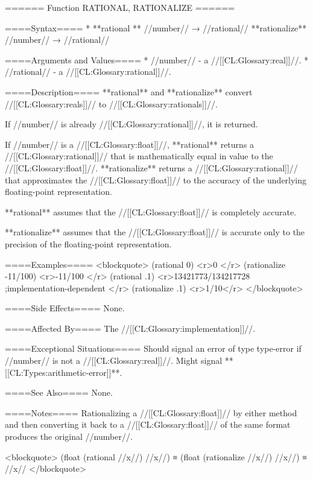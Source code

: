 ====== Function RATIONAL, RATIONALIZE ======

====Syntax====
  * **rational ** //number// → //rational// **rationalize** //number// → //rational//

====Arguments and Values====
  * //number// - a //[[CL:Glossary:real]]//.
  * //rational// - a //[[CL:Glossary:rational]]//.

====Description====
**rational** and **rationalize** convert //[[CL:Glossary:reals]]// to //[[CL:Glossary:rationals]]//.

If //number// is already //[[CL:Glossary:rational]]//, it is returned.

If //number// is a //[[CL:Glossary:float]]//, **rational** returns a //[[CL:Glossary:rational]]// that is mathematically equal in value to the //[[CL:Glossary:float]]//. **rationalize** returns a //[[CL:Glossary:rational]]// that approximates the //[[CL:Glossary:float]]// to the accuracy of the underlying floating-point representation.

**rational** assumes that the //[[CL:Glossary:float]]// is completely accurate.

**rationalize** assumes that the //[[CL:Glossary:float]]// is accurate only to the precision of the floating-point representation.

====Examples====
<blockquote> 
(rational 0) <r>0 </r>
(rationalize -11/100) <r>-11/100 </r>
(rational .1) <r>13421773/134217728 ;implementation-dependent </r>
(rationalize .1) <r>1/10</r>
</blockquote>

====Side Effects====
None.

====Affected By====
The //[[CL:Glossary:implementation]]//.

====Exceptional Situations====
Should signal an error of type type-error if //number// is not a //[[CL:Glossary:real]]//. Might signal **[[CL:Types:arithmetic-error]]**.

====See Also====
None.

====Notes====
Rationalizing a //[[CL:Glossary:float]]// by either method and then converting it back to a //[[CL:Glossary:float]]// of the same format produces the original //number//.

<blockquote> 
(float (rational //x//) //x//) 
  ≡ (float (rationalize //x//) //x//) 
  ≡ //x// 
</blockquote>

